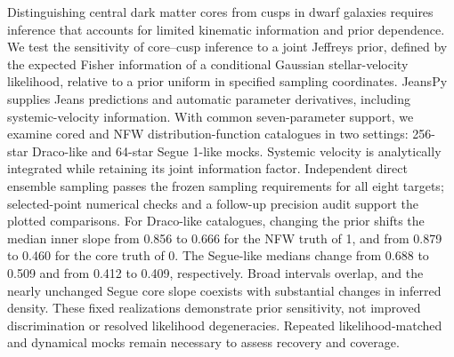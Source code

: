 Distinguishing central dark matter cores from cusps in dwarf galaxies requires inference that accounts for limited kinematic information and prior dependence. We test the sensitivity of core--cusp inference to a joint Jeffreys prior, defined by the expected Fisher information of a conditional Gaussian stellar-velocity likelihood, relative to a prior uniform in specified sampling coordinates. JeansPy supplies Jeans predictions and automatic parameter derivatives, including systemic-velocity information. With common seven-parameter support, we examine cored and NFW distribution-function catalogues in two settings: 256-star Draco-like and 64-star Segue 1-like mocks. Systemic velocity is analytically integrated while retaining its joint information factor. Independent direct ensemble sampling passes the frozen sampling requirements for all eight targets; selected-point numerical checks and a follow-up precision audit support the plotted comparisons. For Draco-like catalogues, changing the prior shifts the median inner slope from 0.856 to 0.666 for the NFW truth of 1, and from 0.879 to 0.460 for the core truth of 0. The Segue-like medians change from 0.688 to 0.509 and from 0.412 to 0.409, respectively. Broad intervals overlap, and the nearly unchanged Segue core slope coexists with substantial changes in inferred density. These fixed realizations demonstrate prior sensitivity, not improved discrimination or resolved likelihood degeneracies. Repeated likelihood-matched and dynamical mocks remain necessary to assess recovery and coverage.
